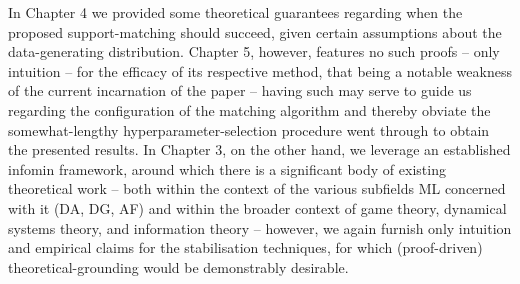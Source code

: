 %
%
In Chapter 4 we provided some theoretical guarantees regarding when the proposed support-matching
should succeed, given certain assumptions about the data-generating distribution.
%
Chapter 5, however, features no such proofs -- only intuition -- for the efficacy of its respective
method, that being a notable weakness of the current incarnation of the paper -- having such may
serve to guide us regarding the configuration of the matching algorithm and thereby obviate the
somewhat-lengthy hyperparameter-selection procedure went through to obtain the presented results.
%
In Chapter 3, on the other hand, we leverage an established infomin framework, around which there
is a significant body of existing theoretical work -- both within the context of the various
subfields ML concerned with it (DA, DG, AF) and within the broader context of game theory,
dynamical systems theory, and information theory -- however, we again furnish only intuition and
empirical claims for the stabilisation techniques, for which (proof-driven) theoretical-grounding
would be demonstrably desirable.

%

